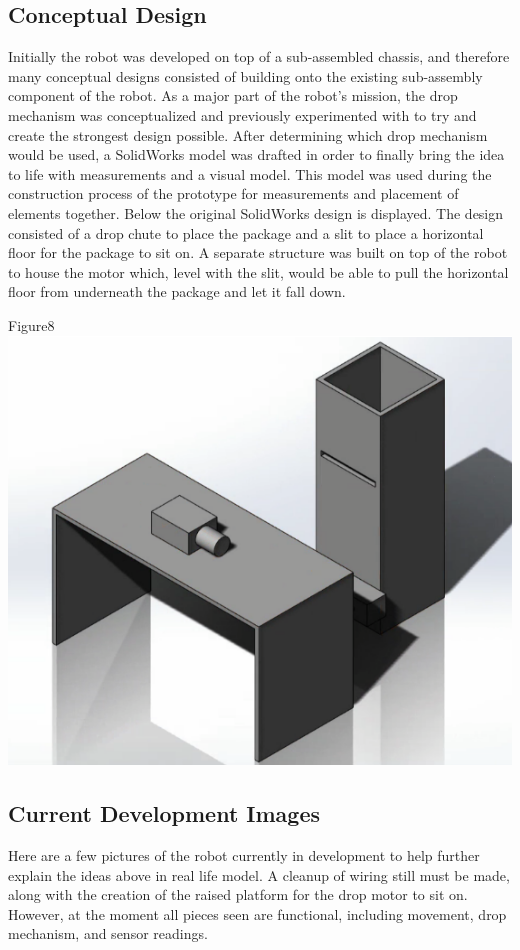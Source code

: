 \documentclass{article}
\begin{document}
\subsection{Conceptual Design}
Initially the robot was developed on top of a sub-assembled chassis, and therefore many conceptual designs consisted of building onto the existing sub-assembly component of the robot. As a major part of the robot's mission, the drop mechanism was conceptualized and previously experimented with to try and create the strongest design possible. After determining which drop mechanism would be used, a SolidWorks model was drafted in order to finally bring the idea to life with measurements and a visual model. This model was used during the construction process of the prototype for measurements and placement of elements together. Below the original SolidWorks design is displayed. The design consisted of a drop chute to place the package and a slit to place a horizontal floor for the package to sit on. A separate structure was built on top of the robot to house the motor which, level with the slit, would be able to pull the horizontal floor from underneath the package and let it fall down.
    
    \begin{center}{Figure8 \includegraphics[width=\textwidth]{Solidworks.png}}\end{center}
    
\subsection{Current Development Images}
Here are a few pictures of the robot currently in development to help further explain the ideas above in real life model. A cleanup of wiring still must be made, along with the creation of the raised platform for the drop motor to sit on. However, at the moment all pieces seen are functional, including movement, drop mechanism, and sensor readings.
\end{document}
